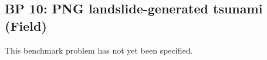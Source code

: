 \newsection

\subsection{BP 10:
 PNG landslide-generated tsunami (Field)}

This benchmark problem has not yet been specified.
